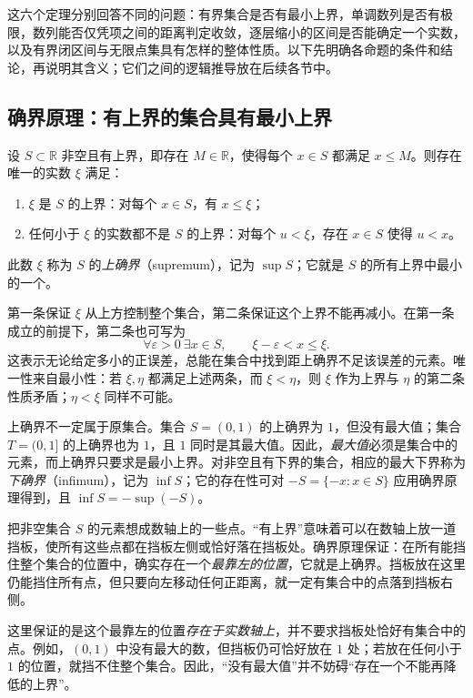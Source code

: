 \documentclass[UTF8,12pt,a4paper,fontset=fandol]{ctexart}
\begin{document}
这六个定理分别回答不同的问题：有界集合是否有最小上界，单调数列是否有极限，数列能否仅凭项之间的距离判定收敛，逐层缩小的区间是否能确定一个实数，以及有界闭区间与无限点集具有怎样的整体性质。以下先明确各命题的条件和结论，再说明其含义；它们之间的逻辑推导放在后续各节中。

\subsection{确界原理：有上界的集合具有最小上界}

\begin{theorem}[确界原理]
  \label{thm:supremum}
  设 $S\subset\mathbb R$ 非空且有上界，即存在 $M\in\mathbb R$，使得每个 $x\in S$ 都满足 $x\leq M$。则存在唯一的实数 $\xi$ 满足：
  \begin{enumerate}
    \item $\xi$ 是 $S$ 的上界：对每个 $x\in S$，有 $x\leq\xi$；
    \item 任何小于 $\xi$ 的实数都不是 $S$ 的上界：对每个 $u<\xi$，存在 $x\in S$ 使得 $u<x$。
  \end{enumerate}
  此数 $\xi$ 称为 $S$ 的\emph{上确界}（supremum），记为 $\sup S$；它就是 $S$ 的所有上界中最小的一个。
\end{theorem}

第一条保证 $\xi$ 从上方控制整个集合，第二条保证这个上界不能再减小。在第一条成立的前提下，第二条也可写为
\[
  \forall\varepsilon>0\ \exists x\in S,
  \qquad \xi-\varepsilon<x\leq\xi.
\]
这表示无论给定多小的正误差，总能在集合中找到距上确界不足该误差的元素。唯一性来自最小性：若 $\xi,\eta$ 都满足上述两条，而 $\xi<\eta$，则 $\xi$ 作为上界与 $\eta$ 的第二条性质矛盾；$\eta<\xi$ 同样不可能。

上确界不一定属于原集合。集合 $S=(0,1)$ 的上确界为 $1$，但没有最大值；集合 $T=(0,1]$ 的上确界也为 $1$，且 $1$ 同时是其最大值。因此，\emph{最大值}必须是集合中的元素，而上确界只要求是最小上界。对非空且有下界的集合，相应的最大下界称为\emph{下确界}（infimum），记为 $\inf S$；它的存在性可对 $-S=\{-x:x\in S\}$ 应用确界原理得到，且 $\inf S=-\sup(-S)$。

\begin{intuitiveexplanation}
把非空集合 $S$ 的元素想成数轴上的一些点。“有上界”意味着可以在数轴上放一道挡板，使所有这些点都在挡板左侧或恰好落在挡板处。确界原理保证：在所有能挡住整个集合的位置中，确实存在一个\emph{最靠左的位置}，它就是上确界。挡板放在这里仍能挡住所有点，但只要向左移动任何正距离，就一定有集合中的点落到挡板右侧。

这里保证的是这个最靠左的位置\emph{存在于实数轴上}，并不要求挡板处恰好有集合中的点。例如，$(0,1)$ 中没有最大的数，但挡板仍可恰好放在 $1$ 处；若放在任何小于 $1$ 的位置，就挡不住整个集合。因此，“没有最大值”并不妨碍“存在一个不能再降低的上界”。
\end{intuitiveexplanation}
\end{document}
